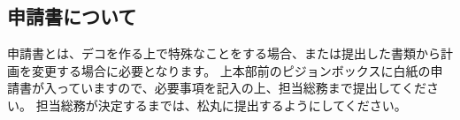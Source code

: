 \begin{multicols*}{2}
\section{申請書について}
\indent 申請書とは、デコを作る上で特殊なことをする場合、または提出した書類から計画を変更する場合に必要となります。
\indent 上本部前のピジョンボックスに白紙の申請書が入っていますので、必要事項を記入の上、担当総務まで提出してください。
担当総務が決定するまでは、松丸に提出するようにしてください。

\end{multicols*}